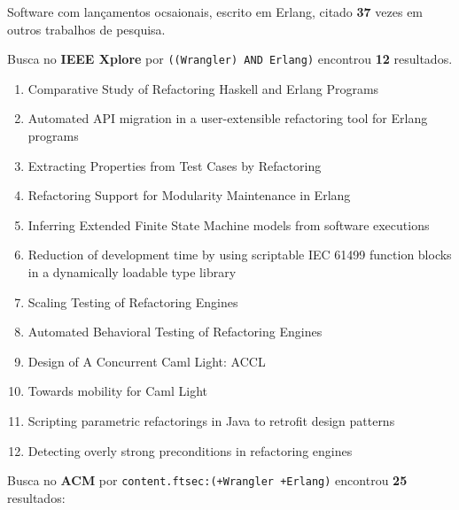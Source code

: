 Software com lançamentos ocsaionais,
escrito em Erlang,
citado {\bf 37} vezes em outros trabalhos de pesquisa.

Busca no {\bf IEEE Xplore} por
\texttt{((Wrangler) AND Erlang)}
encontrou {\bf 12}
resultados.

\begin{enumerate}
\item Comparative Study of Refactoring Haskell and Erlang Programs
\item Automated API migration in a user-extensible refactoring tool for Erlang programs
\item Extracting Properties from Test Cases by Refactoring
\item Refactoring Support for Modularity Maintenance in Erlang
\item Inferring Extended Finite State Machine models from software executions
\item Reduction of development time by using scriptable IEC 61499 function blocks in a dynamically loadable type library
\item Scaling Testing of Refactoring Engines
\item Automated Behavioral Testing of Refactoring Engines
\item Design of A Concurrent Caml Light: ACCL
\item Towards mobility for Caml Light
\item Scripting parametric refactorings in Java to retrofit design patterns
\item Detecting overly strong preconditions in refactoring engines
\end{enumerate}

Busca no {\bf ACM} por
\texttt{content.ftsec:(+Wrangler +Erlang)}
encontrou {\bf 25}
resultados:

